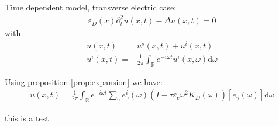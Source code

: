\documentclass[11pt]{article}
\numberwithin{equation}{section}
\newcommand{\R}{\mathbb{R}}
\newcommand{\dd}{\mathrm{d}}
\begin{document}
Time dependent model, transverse electric case:
\begin{align*}
\varepsilon_D(x) \partial_t^2 u(x,t)-\Delta u(x,t) = 0
\end{align*}
with
\begin{align*}
u(x,t)=& u^s(x,t) +u^i(x,t) \\
u^i(x,t) =& \frac{1}{2\pi }\int_\R e^{-i\omega t} u^i(x,\omega) \dd \omega
\end{align*}

Using proposition  \ref{prop:expansion} we have:
\begin{align*}
u(x,t)= \frac{1}{2\pi }\int_\R e^{-i\omega t} \sum_\gamma e_\gamma^i (\omega) \left( I-\tau\varepsilon_c\omega^2 K_D(\omega)\right)[e_\gamma(\omega) ]\dd \omega
\end{align*}

this is a test




\end{document}
